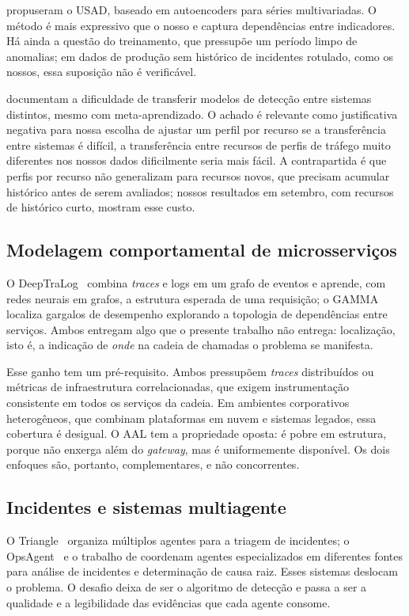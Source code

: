 \documentclass[sigconf,nonacm]{acmart}
\begin{document}
\citet{audibert2020usad} propuseram o USAD, baseado em autoencoders para séries multivariadas. O método é mais expressivo que o nosso e captura dependências entre indicadores. Há ainda a questão do treinamento, que pressupõe um período limpo de anomalias; em dados de produção sem histórico de incidentes rotulado, como os nossos, essa suposição não é verificável.

\citet{wang2025crosssystem} documentam a dificuldade de transferir modelos de detecção entre sistemas distintos, mesmo com meta-aprendizado. O achado é relevante como justificativa negativa para nossa escolha de ajustar um perfil por recurso se a transferência entre sistemas é difícil, a transferência entre recursos de perfis de tráfego muito diferentes nos nossos dados dificilmente seria mais fácil. A contrapartida é que perfis por recurso não generalizam para recursos novos, que precisam acumular histórico antes de serem avaliados; nossos resultados em setembro, com recursos de histórico curto, mostram esse custo.


\subsection{Modelagem comportamental de microsserviços}
O DeepTraLog~\citep{zhang2022deeptralog} combina \emph{traces} e logs em um grafo de eventos e aprende, com redes neurais em grafos, a estrutura esperada de uma requisição; o GAMMA~\citep{somashekar2024gamma} localiza gargalos de desempenho explorando a topologia de dependências entre serviços. Ambos entregam algo que o presente trabalho não entrega: localização, isto é, a indicação de \emph{onde} na cadeia de chamadas o problema se manifesta.

Esse ganho tem um pré-requisito. Ambos pressupõem \emph{traces} distribuídos ou métricas de infraestrutura correlacionadas, que exigem instrumentação consistente em todos os serviços da cadeia. Em ambientes corporativos heterogêneos, que combinam plataformas em nuvem e sistemas legados, essa cobertura é desigual. O AAL tem a propriedade oposta: é pobre em estrutura, porque não enxerga além do \emph{gateway}, mas é uniformemente disponível. Os dois enfoques são, portanto, complementares, e não concorrentes.


\subsection{Incidentes e sistemas multiagente}
O Triangle~\citep{yu2025triangle} organiza múltiplos agentes para a triagem de incidentes; o OpsAgent~\citep{luo2025opsagent} e o trabalho de \citet{zhang2025isre} coordenam agentes especializados em diferentes fontes para análise de incidentes e determinação de causa raiz. Esses sistemas deslocam o problema. O desafio deixa de ser o algoritmo de detecção e passa a ser a qualidade e a legibilidade das evidências que cada agente consome.
\end{document}
